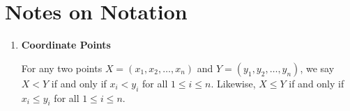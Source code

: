 \section*{Notes on Notation}

\begin{enumerate}
\item \textbf{Coordinate Points}

For any two points $X = (x_1, x_2, \hdots, x_n)$ and $Y = (y_1, y_2, \hdots, y_n)$, we say $X < Y$ if and only if $x_i < y_i$ for all $1 \leq i \leq n$. Likewise, $X \leq Y$ if and only if $x_i \leq y_i$  for all $1 \leq i \leq n$.
\end{enumerate}
